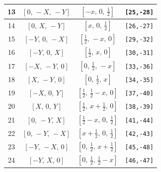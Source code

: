 \documentclass[fleqn,8pt]{jsarticle}
\begin{document}
\begin{longtable}{cccc}
13 & $\left[ 0,\, - X,\, - Y \right]$ & $\left[ - x,\, 0,\, \frac{1}{2} \right]$ & {\tt [25,-28]} \\ \hline
14 & $\left[ 0,\, X,\, - Y \right]$ & $\left[ x,\, 0,\, \frac{1}{2} \right]$ & {\tt [26,-27]} \\ \hline
15 & $\left[ - Y,\, 0,\, - X \right]$ & $\left[ \frac{1}{2},\, - x,\, 0 \right]$ & {\tt [29,-32]} \\ \hline
16 & $\left[ - Y,\, 0,\, X \right]$ & $\left[ \frac{1}{2},\, x,\, 0 \right]$ & {\tt [30,-31]} \\ \hline
17 & $\left[ - X,\, - Y,\, 0 \right]$ & $\left[ 0,\, \frac{1}{2},\, - x \right]$ & {\tt [33,-36]} \\ \hline
18 & $\left[ X,\, - Y,\, 0 \right]$ & $\left[ 0,\, \frac{1}{2},\, x \right]$ & {\tt [34,-35]} \\ \hline
19 & $\left[ - X,\, 0,\, Y \right]$ & $\left[ \frac{1}{2},\, \frac{1}{2} - x,\, 0 \right]$ & {\tt [37,-40]} \\ \hline
20 & $\left[ X,\, 0,\, Y \right]$ & $\left[ \frac{1}{2},\, x + \frac{1}{2},\, 0 \right]$ & {\tt [38,-39]} \\ \hline
21 & $\left[ 0,\, - Y,\, X \right]$ & $\left[ \frac{1}{2} - x,\, 0,\, \frac{1}{2} \right]$ & {\tt [41,-44]} \\ \hline
22 & $\left[ 0,\, - Y,\, - X \right]$ & $\left[ x + \frac{1}{2},\, 0,\, \frac{1}{2} \right]$ & {\tt [42,-43]} \\ \hline
23 & $\left[ - Y,\, - X,\, 0 \right]$ & $\left[ 0,\, \frac{1}{2},\, x + \frac{1}{2} \right]$ & {\tt [45,-48]} \\ \hline
24 & $\left[ - Y,\, X,\, 0 \right]$ & $\left[ 0,\, \frac{1}{2},\, \frac{1}{2} - x \right]$ & {\tt [46,-47]} \\
\end{longtable}
\renewcommand{\arraystretch}{1.2}
\end{document}
